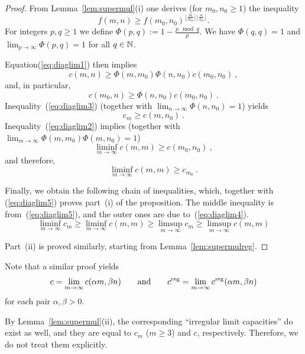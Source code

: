 \begin{proof}
  From Lemma~\ref{lem:supermul}(i) one derives (for $m_0,n_0\geq 1$)
  the inequality
  \begin{equation}
    \label{eq:diaglim1}
    f(m,n)\geq f(m_0,n_0)^{\lfloor\frac{m}{m_0}\rfloor\lfloor\frac{n}{n_0}\rfloor}.
  \end{equation}
  For integers $p,q\geq 1$ we define $\Phi(p,q):=1-\frac{p\mod q}{p}$. We have
  $\Phi(q,q)=1$ and $\lim_{p\rightarrow\infty}\Phi(p,q)=1$ for all
  $q\in\mathbb{N}$. 

  Equation(\ref{eq:diaglim1}) then implies
  \begin{equation}
    \label{eq:diaglim2}
    c(m,n)\geq\Phi(m,m_0)\Phi(n,n_0)c(m_0,n_0)\ ,
  \end{equation}
  and, in particular,
  \begin{equation}
    \label{eq:diaglim3}
    c(m_0,n)\geq\Phi(n,n_0)c(m_0,n_0)\ .
  \end{equation}
  Inequality~(\ref{eq:diaglim3}) (together with
  $\displaystyle\lim_{n\rightarrow\infty}\Phi(n,n_0)=1$) yields
  \begin{equation}
    \label{eq:diaglim4}
    c_m\geq c(m,n_0)\ .
  \end{equation}
  Inequality~(\ref{eq:diaglim2}) implies (together
  with $\displaystyle\lim_{m\rightarrow\infty}\Phi(m,m_0)\Phi(m,n_0)=1$)
  $$
  \liminf_{m\rightarrow\infty} c(m,m)\geq c(m_0,n_0)\ ,
  $$
  and therefore,
  \begin{equation}
    \label{eq:diaglim5}
    \liminf_{m\rightarrow\infty} c(m,m)\geq c_{m_0}\ .
  \end{equation}
  
  Finally, we obtain the following chain of inequalities, which, 
  together with (\ref{eq:diaglim5}) proves part~(i) of the proposition.
  The middle inequality is from~(\ref{eq:diaglim5}), and the
  outer ones are due to~(\ref{eq:diaglim4}).
  $$
          \liminf_{m\rightarrow\infty}c_m
    \geq  \liminf_{m\rightarrow\infty}c(m,m)
    \geq  \limsup_{m\rightarrow\infty}c_m
    \geq  \limsup_{m\rightarrow\infty}c(m,m)
  $$

  Part~(ii) is proved similarly, starting from Lemma~\ref{lem:supermulreg}.
\end{proof}

Note that a similar proof yields
$$
c=\lim_{m\rightarrow\infty}c(\alpha m,\beta n)
\qquad\text{and}\qquad
c^{\mathrm{reg}}=\lim_{m\rightarrow\infty}c^{\mathrm{reg}}(\alpha m,\beta n)
$$
for each pair $\alpha,\beta>0$.

By Lemma~\ref{lem:supermul}(ii), the corresponding ``irregular limit
capacities'' do exist as well, and they are equal to $c_m$
($m\ge3$) and $c$, respectively. Therefore, we do not treat them
explicitly.





